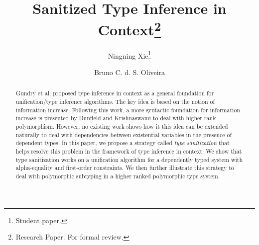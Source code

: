 \documentclass[oribibl]{llncs}
\begin{document}
\title{Sanitized Type Inference in Context\thanks{Research Paper. For formal review.}}

\author{Ningning Xie\thanks{Student paper.} \and Bruno C. d. S. Oliveira}

\maketitle

\begin{abstract}
  Gundry et al. proposed type inference in context as a general foundation for
  unification/type inference algorithms. The key idea is based on the notion of
  information increase. Following this work, a more syntactic foundation for
  information increase is presented by Dunfield and Krishnaswami to deal with higher rank polymorphism.
  However, no existing work shows how it this idea can be extended naturally to deal
  with dependencies between existential variables in the presence of dependent types.
  In this paper, we propose a strategy called \textit{type
    sanitization} that helps resolve this problem
  in the framework of type inference in context. We show
  that type sanitization works on a unification algorithm for a dependently typed
  system with alpha-equality and first-order constraints. We then further illustrate
  this strategy to deal with polymorphic subtyping in a higher ranked
  polymorphic type system.
\end{abstract}




\setlength{\belowcaptionskip}{-1pt}








% 



\appendix



\end{document}
